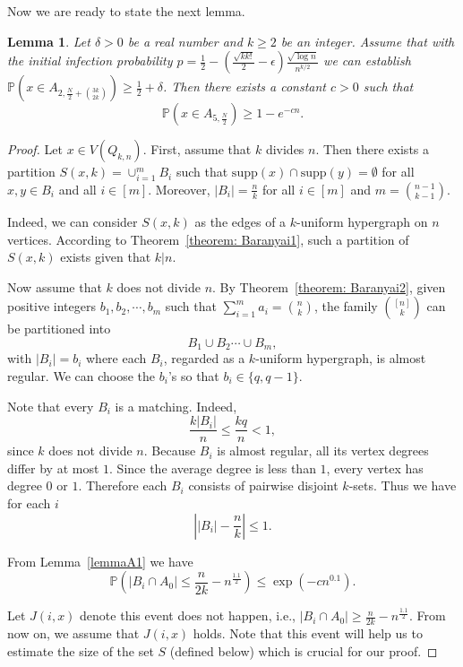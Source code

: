 \documentclass[reqno,11pt]{amsart}
\newtheorem{lemma}[theorem]{Lemma}
\renewcommand{\leq}{\leqslant}
\renewcommand{\geq}{\geqslant}
\begin{document}
Now we are ready to state the next lemma.
\begin{lemma} \label{lemma: 1-exp(-cn)}
   Let $\delta > 0$ be a real number and $k \geq 2$ be an integer. Assume that with the initial infection probability $p=\frac{1}{2}-\left(\frac{\sqrt{kk!}}{2}-\epsilon \right)\frac{\sqrt{\log n}}{n^{k/2}}$ we can establish $\mathbb{P}\left(x \in A_{2,\frac{N}{2}+\binom{3k}{2k}} \right) \geq \frac{1}{2}+\delta$. Then there exists a constant $c > 0$  such that 
   $$\mathbb{P}(x \in A_{5,\frac{N}{2}}) \geq 1-e^{-cn}.$$

\end{lemma} 

\begin{proof} Let $x \in V(Q_{k,n})$. First, assume that $k$ divides $n$. Then there exists a partition $S(x,k)=\cup_{i=1}^{m}B_i$ such that $\text{supp}(x) \cap \text{supp}(y) = \emptyset$ for all $x, y \in B_i$ and all $i \in [m]$. Moreover, $|B_i|=\frac{n}{k}$ for all $i \in [m]$ and $m=\binom{n-1}{k-1}$.

Indeed, we can consider $S(x,k)$ as the edges of a $k$-uniform hypergraph on $n$ vertices. According to Theorem~\ref{theorem: Baranyai1}, such a partition of $S(x,k)$ exists given that $k|n$.

Now assume that $k$ does not divide $n$. By Theorem~\ref{theorem: Baranyai2}, given positive integers $b_1,b_2,\cdots,b_m$ such that $\sum_{i=1}^m a_i=\binom{n}{k}$, the family $\binom{[n]}{k}$ can be partitioned into 
$$B_1 \cup B_2 \cdots \cup B_m,$$
with $|B_i|=b_i$ where each $B_i$, regarded as a $k$-uniform hypergraph, is almost regular. We can choose the $b_i$'s so that $b_i \in \{q,q-1\}$. 

Note that every $B_i$ is a matching. Indeed,
$$\frac{k|B_i|}{n} \leq \frac{kq}{n} <1,$$
since $k$ does not divide $n$. Because $B_i$ is almost regular, all its vertex degrees differ by at most $1$. Since the average degree is less than $1$, every vertex has degree $0$ or $1$. Therefore each $B_i$ consists of pairwise disjoint $k$-sets. Thus we have for each $i$
$$\left||B_i|-\frac{n}{k} \right|\leq 1.$$

From Lemma~\ref{lemmaA1} we have $$\mathbb{P}(|B_i \cap A_0| \leq \frac{n}{2k}-n^{\frac{1.1}{2}}) \leq \exp(-cn^{0.1}).$$

Let $J(i,x)$ denote this event does not happen, i.e., $|B_i \cap A_0|\geq \frac{n}{2k}-n^{\frac{1.1}{2}}$. From now on, we assume that $J(i,x)$ holds. Note that this event will help us to estimate the size of the set $S$ (defined below) which is crucial for our proof.


\end{proof}
\end{document}
